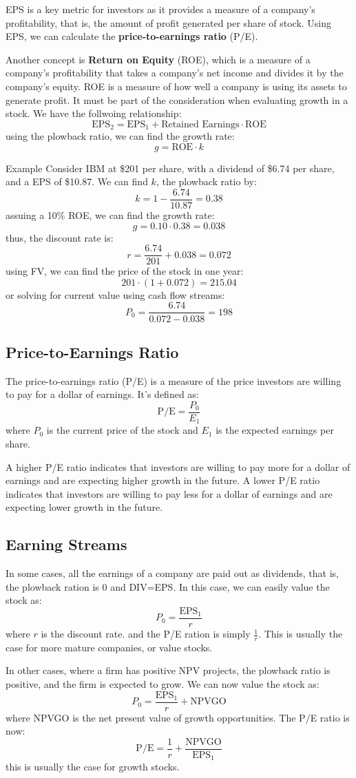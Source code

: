 EPS is a key metric for investors as it provides a measure of a company's profitability, that is, the amount of profit generated per share of stock. Using EPS, we can calculate the \textbf{price-to-earnings ratio} (P/E).

Another concept is \textbf{Return on Equity} (ROE), which is a measure of a company's profitability that takes a company's net income and divides it by the company's equity. ROE is a measure of how well a company is using its assets to generate profit. It must be part of the consideration when evaluating growth in a stock. We have the follwoing relationship:
$$
\text{EPS}_2 = \text{EPS}_1 + \text{Retained Earnings} \cdot \text{ROE}
$$
using the plowback ratio, we can find the growth rate:
$$
	g = \text{ROE} \cdot k
$$

\begin{examplebox}{Example}
	Consider IBM at \$201 per share, with a dividend of \$6.74 per share, and a EPS of \$10.87. We can find $k$, the plowback ratio by:
	$$
		k = 1 - \frac{6.74}{10.87} = 0.38
	$$
	assuing a 10\% ROE, we can find the growth rate:
	$$
	g = 0.10 \cdot 0.38 = 0.038
	$$
	thus, the discount rate is:
	$$
		r = \frac{6.74}{201} + 0.038 = 0.072
	$$
	using FV, we can find the price of the stock in one year:
	$$
		201\cdot (1 + 0.072) = 215.04
	$$
	or solving for current value using cash flow streams:
	$$
		P_0 = \frac{6.74}{0.072-0.038} = 198
	$$
\end{examplebox}

\subsection{Price-to-Earnings Ratio}
The price-to-earnings ratio (P/E) is a measure of the price investors are willing to pay for a dollar of earnings. It's defined as:
$$
\text{P/E} = \frac{P_0}{E_1}
$$
where $P_0$ is the current price of the stock and $E_1$ is the expected earnings per share. 

A higher P/E ratio indicates that investors are willing to pay more for a dollar of earnings and are expecting higher growth in the future. A lower P/E ratio indicates that investors are willing to pay less for a dollar of earnings and are expecting lower growth in the future.

\subsection{Earning Streams}
In some cases, all the earnings of a company are paid out as dividends, that is, the plowback ration is 0 and DIV=EPS. In this case, we can easily value the stock as:
$$
P_0 = \frac{\text{EPS}_1}{r}
$$
where $r$ is the discount rate. and the P/E ration is simply $\frac{1}{r}$. This is usually the case for more mature companies, or value stocks.

In other cases, where a firm has positive NPV projects, the plowback ratio is positive, and the firm is expected to grow. We can now value the stock as:
$$
P_0 = \frac{\text{EPS}_1}{r} + \text{NPVGO}
$$
where NPVGO is the net present value of growth opportunities. The P/E ratio is now:
$$
\text{P/E} = \frac{1}{r} + \frac{\text{NPVGO}}{\text{EPS}_1}
$$
this is usually the case for growth stocks.

